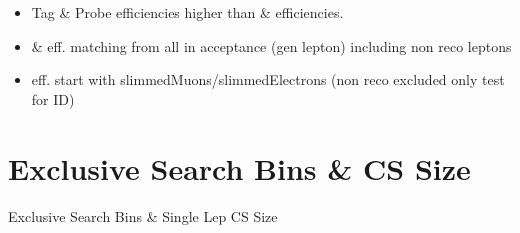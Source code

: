 \documentclass{beamer}
\begin{document}
\begin{frame}
\begin{columns}
\begin{column}{0.50\textwidth}
   \end{column}
  \end{columns}
\begin{itemize}
 \item Tag \& Probe efficiencies higher than \ttbar \& \wpj efficiencies.
 \item \ttbar \& \wpj eff. matching from all in acceptance (gen lepton) including non reco leptons
 \item \Zll eff. start with slimmedMuons/slimmedElectrons (non reco excluded only test for ID)
\end{itemize}

\end{frame}

\section{Exclusive Search Bins \& CS Size}

\begin{frame}
 \begin{block}{}
 \centering
 \Large Exclusive Search Bins \& Single Lep CS Size
 \end{block}
\end{frame}
\end{document}
